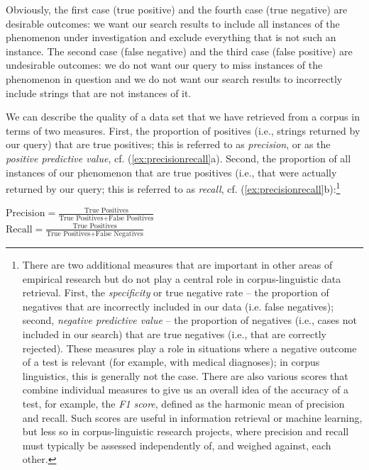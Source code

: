 Obviously, the first case (true positive) and the fourth case (true negative) are desirable outcomes: we want our search results to include all instances of the phenomenon under investigation and exclude everything that is not such an instance. The second case (false negative) and the third case (false positive) are undesirable outcomes: we do not want our query  to miss instances of the phenomenon in question and we do not want our search results to incorrectly include strings that are not instances of it.

We can describe the quality of a data set that we have retrieved  from a corpus in terms of two measures. First, the proportion of positives (i.e., strings returned by our query)  that are true positives; this is referred to as \textit{precision},  or as the \textit{positive predictive value}, cf. (\ref{ex:precisionrecall}a). Second, the proportion of all instances of our phenomenon that are true positives (i.e., that were actually returned by our query; this is referred to as \textit{recall},  cf. (\ref{ex:precisionrecall}b):\footnote{There are two additional measures that are important in other areas of empirical research but do not play a central role in corpus\hyp{}linguistic data retrieval.  First, the \emph{specificity} or true negative rate -- the proportion of negatives that are incorrectly included in our data (i.e. false negatives); second, \emph{negative predictive value} -- the proportion of negatives (i.e., cases not included in our search) that are true negatives (i.e., that are correctly rejected). These measures play a role in situations where a negative outcome of a test is relevant (for example, with medical diagnoses); in corpus linguistics, this is generally not the case. There are also various scores that combine individual measures to give us an overall idea of the accuracy of a test, for example, the \emph{F1 score}, defined as the harmonic mean of precision  and recall.  Such scores are useful in information retrieval  or machine learning, but less so in corpus\hyp{}linguistic research projects, where precision and recall must typically be assessed independently of, and weighed against, each other.}

\begin{exe}
\ex
\begin{xlist}
\label{ex:precisionrecall}
\ex $\displaystyle{\text{Precision} = \frac{\text{True Positives}}{\text{True Positives} + \text{False Positives}}}$\\
\ex $\displaystyle{\text{Recall} = \frac{\text{True Positives}}{\text{True Positives} + \text{False Negatives}}}$
\end{xlist}
\end{exe}

